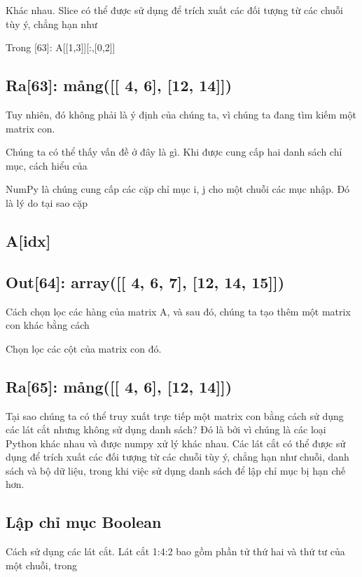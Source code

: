 Khác nhau. Slice có thể được sử dụng để trích xuất các đối tượng từ các chuỗi tùy ý, chẳng hạn như

Trong [63]: A[[1,3]][:,[0,2]]

\subsection{Ra[63]: mảng([[ 4, 6], [12, 14]])}

Tuy nhiên, đó không phải là ý định của chúng ta, vì chúng ta đang tìm kiếm một matrix con.

Chúng ta có thể thấy vấn đề ở đây là gì. Khi được cung cấp hai danh sách chỉ mục, cách hiểu của

NumPy là chúng cung cấp các cặp chỉ mục i, j cho một chuỗi các mục nhập. Đó là lý do tại sao cặp

\subsection{A[idx]}

\subsection{Out[64]: array([[ 4, 6, 7], [12, 14, 15]])}

Cách chọn lọc các hàng của matrix A, và sau đó, chúng ta tạo thêm một matrix con khác bằng cách

Chọn lọc các cột của matrix con đó.

\subsection{Ra[65]: mảng([[ 4, 6], [12, 14]])}

Tại sao chúng ta có thể truy xuất trực tiếp một matrix con bằng cách sử dụng các lát cắt nhưng không sử dụng danh sách? Đó là bởi vì chúng là các loại Python khác nhau và được numpy xử lý khác nhau. Các lát cắt có thể được sử dụng để trích xuất các đối tượng từ các chuỗi tùy ý, chẳng hạn như chuỗi, danh sách và bộ dữ liệu, trong khi việc sử dụng danh sách để lập chỉ mục bị hạn chế hơn.

\subsection{Lập chỉ mục Boolean}

Cách sử dụng các lát cắt. Lát cắt 1:4:2 bao gồm phần tử thứ hai và thứ tư của một chuỗi, trong

